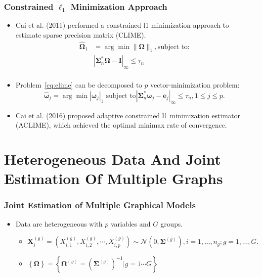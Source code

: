 \documentclass{beamer}
\newcommand{\bI}{\mathbf I}
\newcommand{\be}{\mathbf e}
\newcommand{\bomega}{{\boldsymbol{\omega}}}
\newcommand{\bOmega}{{\boldsymbol{\Omega}}}
\newcommand{\bSigma}{{\boldsymbol{\Sigma}}}
\begin{document}
\begin{frame}
	\frametitle{Constrained $\ell_1$ Minimization Approach}
	\begin{itemize}[<+->]
		\item Cai et al. (2011) performed a constrained l1 minimization approach to estimate sparse precision matrix (CLIME).
		\begin{equation}
			\label{eq:clime}
			\begin{aligned}
			\hat{\bOmega}_1 &= \arg\min \|\bOmega\|_1, \text{subject to:} \\
			& |\bSigma_n^* \bOmega - \bI|_{\infty} \leq \tau_{n} \\
			\end{aligned}
		\end{equation}
        \item Problem~\ref{eq:clime} can be decomposed to $p$ vector-minimization problem:
        $$\hat{\bomega}_j = \arg\min |\bomega_j|_1 \text{ subject to} |\bSigma_n^* \bomega_j - \be_j|_{\infty} \leq \tau_{n}, 1 \leq j \leq p.$$
        \item Cai et al. (2016) proposed adaptive constrained l1 minimization estimator (ACLIME), which achieved the optimal minimax rate of convergence.
	\end{itemize}
\end{frame}

\section{Heterogeneous Data And Joint Estimation Of Multiple Graphs}

\begin{frame}

\frametitle{Joint Estimation of Multiple Graphical Models}

\begin{itemize}[<+->]
\item Data are heterogeneous with $p$ variables and $G$ groups.
    \begin{itemize}
    \item $\mathbf{X}_i^{(g)} = (X_{i,1}^{(g)}, X_{i,2}^{(g)}, \cdots, X_{i,p}^{(g)}) \sim \mathcal{N}(0, \bSigma^{(g)}), i = 1, \dots, n_g; g = 1, \dots, G.$
    \item $\left\{\bOmega \right\} = \left\{ \bOmega^{(g)} = (\bSigma^{(g)})^{-1}| g = 1 \cdots G \right\}$
    \end{itemize} 
       
\end{itemize}

\end{frame}
\end{document}
